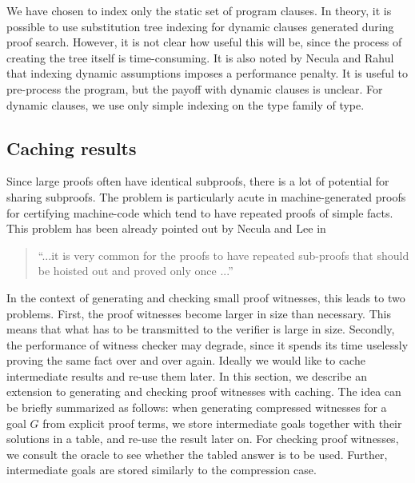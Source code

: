 \documentclass{llncs}
\begin{document}
We have chosen to index only the static set of program clauses. In
theory, it is possible to use substitution tree indexing for dynamic
clauses generated during proof search.  However, it is not clear how
useful this will be, since the process of creating the tree itself is
time-consuming. It is also noted by Necula and Rahul
\cite{Necula+01:oracle} that indexing dynamic assumptions imposes a
performance penalty. It is useful to pre-process the program, but the
payoff with dynamic clauses is unclear. For dynamic clauses, we use
only simple indexing on the type family of type.



\subsection{Caching results}
\label{sec:tabling}
Since large proofs often have identical subproofs,  there is a
lot of potential for sharing subproofs. The problem is particularly
acute in machine-generated proofs for certifying machine-code which
tend to have repeated proofs of simple facts. This problem has been
already pointed out by Necula and Lee in \cite{NeculaLee+97:resource}

\begin{quote}
``...it is very common for the proofs to have  
repeated sub-proofs that should be hoisted out and 
proved only once ...'' \cite{NeculaLee+97:resource}
 \end{quote}


In the context of generating and checking small proof witnesses, this
leads to two problems.  First, the proof witnesses become larger in
size than necessary. This means that what has to be transmitted to the
verifier is large in size. Secondly, the performance of witness
checker may degrade, since it spends its time uselessly proving the
same fact over and over again. Ideally we would like to cache
intermediate results and re-use them later. In this section, we
describe an extension to generating and checking proof witnesses with
caching. The idea can be briefly summarized as follows: when
generating compressed witnesses for a goal $G$ from explicit proof
terms, we store intermediate goals together with their solutions in a
table, and re-use the result later on. For checking proof witnesses,
we consult the oracle to see whether the tabled answer is to be
used. Further, intermediate goals are stored similarly to the
compression case.
\end{document}
